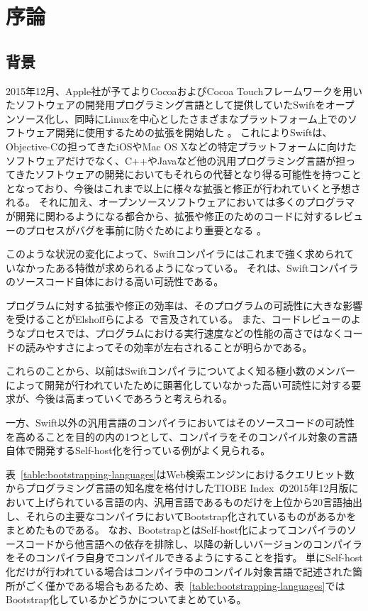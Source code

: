 \chapter{序論}
\label{introduction}

\section{背景}
\label{introduction:background}

2015年12月、Apple社が予てよりCocoaおよびCocoa Touchフレームワークを用いたソフトウェアの開発用プログラミング言語として提供していたSwiftをオープンソース化し、同時にLinuxを中心としたさまざまなプラットフォーム上でのソフトウェア開発に使用するための拡張を開始した
。
これによりSwiftは、Objective-Cの担ってきたiOSやMac OS Xなどの特定プラットフォームに向けたソフトウェアだけでなく、C++やJavaなど他の汎用プログラミング言語が担ってきたソフトウェアの開発においてもそれらの代替となり得る可能性を持つこととなっており、今後はこれまで以上に様々な拡張と修正が行われていくと予想される。
それに加え、オープンソースソフトウェアにおいては多くのプログラマが開発に関わるようになる都合から、拡張や修正のためのコードに対するレビューのプロセスがバグを事前に防ぐためにより重要となる
。

このような状況の変化によって、Swiftコンパイラにはこれまで強く求められていなかったある特徴が求められるようになっている。
それは、Swiftコンパイラのソースコード自体における高い可読性である。

プログラムに対する拡張や修正の効率は、そのプログラムの可読性に大きな影響を受けることがElshoffらによる~\cite{elshoff}で言及されている。
また、コードレビューのようなプロセスでは、プログラムにおける実行速度などの性能の高さではなくコードの読みやすさによってその効率が左右されることが明らかである。

これらのことから、以前はSwiftコンパイラについてよく知る極小数のメンバーによって開発が行われていたために顕著化していなかった高い可読性に対する要求が、今後は高まっていくであろうと考えられる。

一方、Swift以外の汎用言語のコンパイラにおいてはそのソースコードの可読性を高めることを目的の内の1つとして、コンパイラをそのコンパイル対象の言語自体で開発するSelf-host化を行っている例がよく見られる。

表~\ref{table:bootstrapping-languages}はWeb検索エンジンにおけるクエリヒット数からプログラミング言語の知名度を格付けしたTIOBE Index~\cite{tiobe}の2015年12月版において上げられている言語の内、汎用言語であるものだけを上位から20言語抽出し、それらの主要なコンパイラにおいてBootstrap化されているものがあるかをまとめたものである。
なお、BootstrapとはSelf-host化によってコンパイラのソースコードから他言語への依存を排除し、以降の新しいバージョンのコンパイラをそのコンパイラ自身でコンパイルできるようにすることを指す。
単にSelf-host化だけが行われている場合はコンパイラ中のコンパイル対象言語で記述された箇所がごく僅かである場合もあるため、表~\ref{table:bootstrapping-languages}ではBootstrap化しているかどうかについてまとめている。

